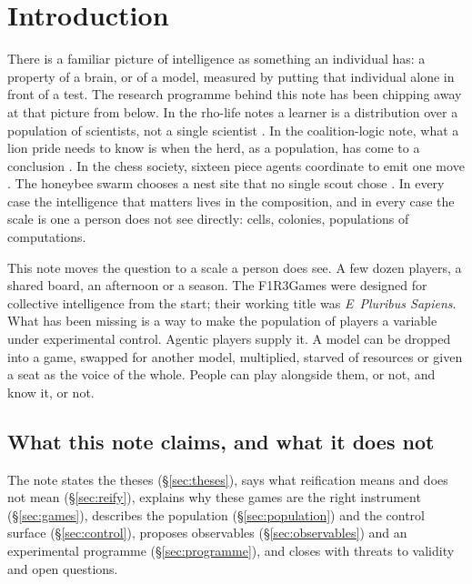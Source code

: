 \documentclass[11pt,a4paper]{article}
\begin{document}
\vspace{2mm}
\begingroup\small\setlength{\parskip}{0pt}\setcounter{tocdepth}{1}\tableofcontents\endgroup
\newpage

\section{Introduction}\label{sec:intro}

There is a familiar picture of intelligence as something an individual has: a property of a
brain, or of a model, measured by putting that individual alone in front of a test. The research
programme behind this note has been chipping away at that picture from below. In the rho-life
notes a learner is a distribution over a population of scientists, not a single scientist
\cite{rholife-compose}. In the coalition-logic note, what a lion pride needs to know is when the
herd, as a population, has come to a conclusion \cite{herd-note}. In the chess society, sixteen
piece agents coordinate to emit one move \cite{chess-note}. The honeybee swarm chooses a nest site
that no single scout chose \cite{seeley,herd-note}. In every case the intelligence that matters lives in the
composition, and in every case the scale is one a person does not see directly: cells, colonies,
populations of computations.

This note moves the question to a scale a person does see. A few dozen players, a shared board,
an afternoon or a season. The F1R3Games were designed for collective intelligence from the start;
their working title was \emph{E~Pluribus Sapiens}. What has been missing is a way to make the
population of players a variable under experimental control. Agentic players supply it. A model can
be dropped into a game, swapped for another model, multiplied, starved of resources or given a
seat as the voice of the whole. People can play alongside them, or not, and know it, or not.

\subsection{What this note claims, and what it does not}

The note states the theses (\S\ref{sec:theses}), says what reification means and does not mean
(\S\ref{sec:reify}), explains why these games are the right instrument (\S\ref{sec:games}),
describes the population (\S\ref{sec:population}) and the control surface (\S\ref{sec:control}),
proposes observables (\S\ref{sec:observables}) and an experimental programme
(\S\ref{sec:programme}), and closes with threats to validity and open questions.
\end{document}
